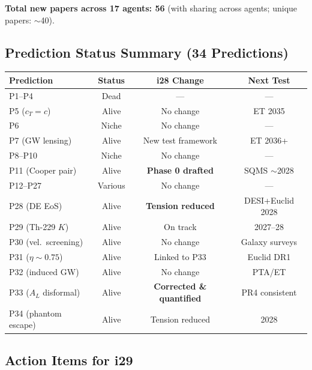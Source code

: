 \documentclass[11pt,a4paper]{article}
\begin{document}
\textbf{Total new papers across 17 agents: 56} (with sharing across agents; unique papers: $\sim$40).

\subsection{Prediction Status Summary (34 Predictions)}

\begin{center}
\begin{tabular}{lccc}
\toprule
\textbf{Prediction} & \textbf{Status} & \textbf{i28 Change} & \textbf{Next Test} \\
\midrule
P1--P4 & Dead & --- & --- \\
P5 ($c_T = c$) & Alive & No change & ET 2035 \\
P6 & Niche & No change & --- \\
P7 (GW lensing) & Alive & New test framework & ET 2036+ \\
P8--P10 & Niche & No change & --- \\
P11 (Cooper pair) & Alive & \textbf{Phase 0 drafted} & SQMS $\sim$2028 \\
P12--P27 & Various & No change & --- \\
P28 (DE EoS) & Alive & \textbf{Tension reduced} & DESI+Euclid 2028 \\
P29 (Th-229 $K$) & Alive & On track & 2027--28 \\
P30 (vel.\ screening) & Alive & No change & Galaxy surveys \\
P31 ($\eta \sim 0.75$) & Alive & Linked to P33 & Euclid DR1 \\
P32 (induced GW) & Alive & No change & PTA/ET \\
P33 ($A_L$ disformal) & Alive & \textbf{Corrected \& quantified} & PR4 consistent \\
P34 (phantom escape) & Alive & Tension reduced & 2028 \\
\bottomrule
\end{tabular}
\end{center}

\subsection{Action Items for i29}
\end{document}
